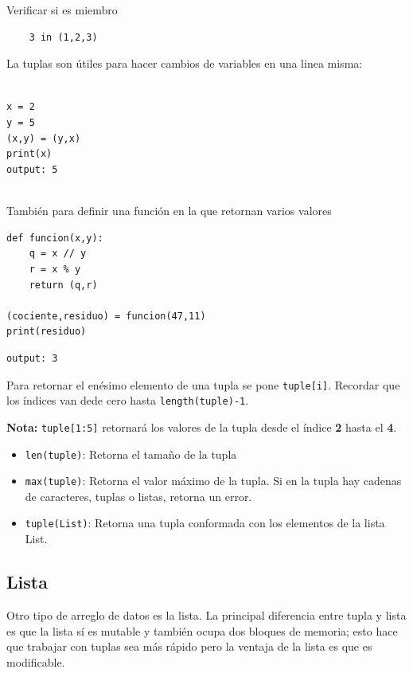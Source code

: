 Verificar si es miembro

\begin{verbatim}
    3 in (1,2,3)
\end{verbatim}

La tuplas son útiles para hacer cambios de variables en una linea misma: \\\

\texttt{x = 2}\\
\texttt{y = 5}\\
\texttt{(x,y) = (y,x)}\\
\texttt{print(x)}\\
\texttt{output: 5}\\\

También para definir una función en la que retornan varios valores

\begin{verbatim}
def funcion(x,y):
    q = x // y
    r = x % y
    return (q,r)
    
(cociente,residuo) = funcion(47,11)
print(residuo)
\end{verbatim}
\begin{lstlisting}
output: 3
\end{lstlisting}

Para retornar el enésimo elemento de una tupla se pone \texttt{tuple[i]}. Recordar que los índices van dede cero hasta \texttt{length(tuple)-1}. 

\textbf{Nota:} \texttt{tuple[1:5]} retornará los valores de la tupla desde el índice \textbf{2} hasta el \textbf{4}.

\begin{itemize}
    \item \texttt{len(tuple)}: Retorna el tamaño de la tupla
    \item \texttt{max(tuple)}: Retorna el valor máximo de la tupla. Si en la tupla hay cadenas de caracteres, tuplas o listas, retorna un error.
    \item \texttt{tuple(List)}: Retorna una tupla conformada con los elementos de la lista List.
\end{itemize}

\subsection{Lista}

Otro tipo de arreglo de datos es la lista. La principal diferencia entre tupla y lista es que la lista sí es mutable y también ocupa dos bloques de memoria; esto hace que trabajar con tuplas sea más rápido pero la ventaja de la lista es que es modificable.

